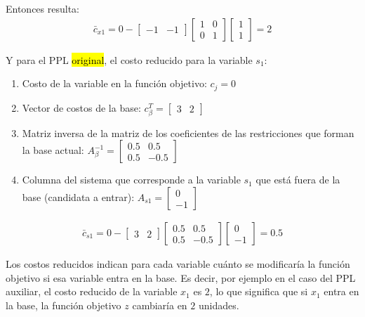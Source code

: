 Entonces resulta:
\begin{align*}
  \bar{c}_{x1} = 0 - \begin{bmatrix} -1 & -1 \end{bmatrix} \begin{bmatrix} 1 & 0\\ 0 & 1 \end{bmatrix} \begin{bmatrix} 1\\ 1 \end{bmatrix} = 2
\end{align*}

\noindent Y para el PPL \hl{original}, el costo reducido para la variable \(s_1\):
\begin{enumerate}
  \item Costo de la variable en la función objetivo: \(c_j = 0\)
  \item Vector de costos de la base: \(c_\beta^T = \begin{bmatrix} 3 & 2 \end{bmatrix}\)
  \item Matriz inversa de la matriz de los coeficientes de las restricciones que forman la base actual: \(A_\beta^{-1} = \begin{bmatrix} 0.5 & 0.5\\ 0.5 & -0.5 \end{bmatrix}\)
  \item Columna del sistema que corresponde a la variable \(s_1\) que está fuera de la base (candidata a entrar): \(A_{s1} = \begin{bmatrix} 0\\ -1 \end{bmatrix}\)
\end{enumerate}
\begin{align*}
  \bar{c}_{s1} = 0 - \begin{bmatrix} 3 & 2 \end{bmatrix} \begin{bmatrix} 0.5 & 0.5\\ 0.5 & -0.5 \end{bmatrix} \begin{bmatrix} 0\\ -1 \end{bmatrix} = 0.5
\end{align*}

\vspace{5mm}

\begin{tcolorbox}[remember, title=¿Para qué usamos costos reducidos?]
  Los costos reducidos indican para cada variable cuánto se modificaría la función objetivo si esa variable entra en la base. Es decir, por ejemplo en el caso del PPL auxiliar, el costo reducido de la variable \(x_1\) es \(2\), lo que significa que si \(x_1\) entra en la base, la función objetivo \(z\) cambiaría en \(2\) unidades.
\end{tcolorbox}

